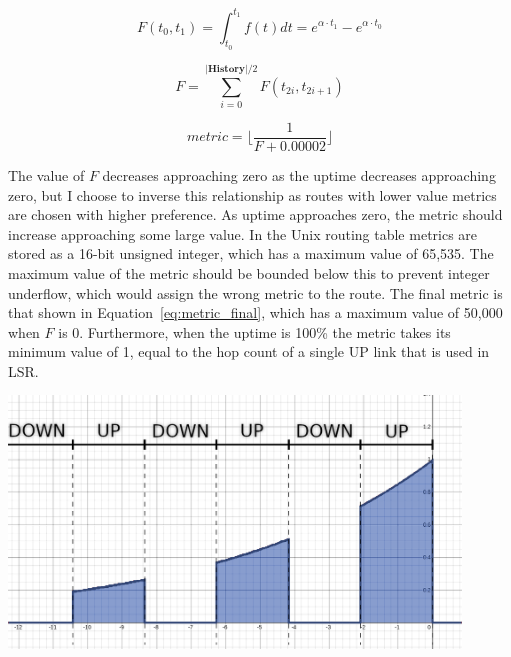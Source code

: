 \documentclass[withindex,glossary,openany]{cam-thesis}
\begin{document}
\begin{equation} \label{eq:metric_integral}
F(t_0, t_1) = \int_{t_0}^{t_1} f(t)dt = e^{\alpha \cdot t_1} - e^{\alpha \cdot t_0}
\end{equation}

\begin{equation} \label{eq:metric_sum}
F = \sum_{i = 0}^{|\textbf{History}|/2} F(t_{2i}, t_{2i+1})
\end{equation}

\begin{equation} \label{eq:metric_final}
\textit{metric} = \Big\lfloor\frac{1}{F+0.00002}\Big\rfloor
\end{equation}

The value of $F$ decreases approaching zero as the uptime decreases approaching zero, but I choose to inverse this relationship as routes with lower value metrics are chosen with higher preference. As uptime approaches zero, the metric should increase approaching some large value. In the Unix routing table metrics are stored as a 16-bit unsigned integer, which has a maximum value of 65,535. The maximum value of the metric should be bounded below this to prevent integer underflow, which would assign the wrong metric to the route. The final metric is that shown in Equation~\ref{eq:metric_final}, which has a maximum value of 50,000 when $F$ is 0. Furthermore, when the uptime is 100\% the metric takes its minimum value of 1, equal to the hop count of a single UP link that is used in LSR.

\begin{center}
\begin{minipage}{0.9\textwidth} \centering
	\includegraphics[width=0.9\textwidth]{metric}
	\label{fig:metric}
\end{minipage}
\end{center}
\end{document}
